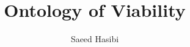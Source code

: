 

\newcommand{\SystemName}{Viability Philosophy System}

\newcommand{\BookSeriesTitle}{Viability Philosophy System}


\newcommand{\BookID}{VS.B01}

\newcommand{\BookNumber}{Book I}

\newcommand{\BookTitle}{Ontology of Viability}

\newcommand{\BookFullTitle}{Ontology of Viability}


\author{Saeed Hasibi}

\newcommand{\BookAuthor}{Saeed Hasibi}



\date{}


\title{\BookFullTitle}

